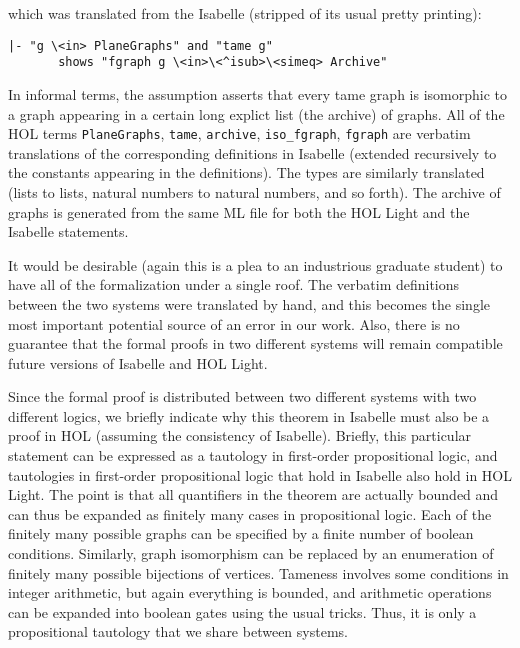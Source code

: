 which was translated from the Isabelle (stripped of its usual pretty printing):

\begin{obeylines}

\begin{verbatim}
|- "g \<in> PlaneGraphs" and "tame g" 
       shows "fgraph g \<in>\<^isub>\<simeq> Archive"
\end{verbatim}

\end{obeylines}


In informal terms, the assumption asserts that every tame graph is isomorphic to a graph appearing in a certain
long explict list (the archive) of graphs.  All of the HOL terms \verb!PlaneGraphs!, \verb!tame!, \verb!archive!,
\verb!iso_fgraph!, \verb!fgraph! are verbatim translations of the corresponding definitions in Isabelle (extended
recursively to the constants appearing in the definitions).  The types are similarly translated (lists to lists, natural numbers
to natural numbers, and so forth).  The archive of graphs is generated from the same ML file for
both the HOL Light and the Isabelle statements.  

It would be desirable (again this is a plea to an industrious graduate student) to have all of the formalization under a single roof.
The verbatim definitions between the two systems were translated by hand, and this becomes the single most important potential
source of an error in our work.  Also,  there is no guarantee that
the formal proofs in two different systems will remain compatible future versions of Isabelle and HOL Light.

Since the formal proof is distributed between two different systems with two different logics, we briefly indicate why
this theorem in Isabelle must also be a proof in HOL (assuming the consistency of Isabelle).  Briefly, this particular statement
can be expressed as a tautology in first-order propositional logic, and tautologies in first-order propositional logic that hold
in Isabelle also hold in HOL Light.  The point is that all quantifiers in the theorem are actually bounded and can thus be
expanded as finitely many cases in propositional logic.   Each of the finitely many possible graphs can be specified by a finite number of
boolean conditions.  Similarly, graph isomorphism can be replaced by an enumeration of finitely
many possible bijections of vertices.  
Tameness involves some conditions in integer arithmetic, but again everything is bounded, 
and arithmetic operations can be expanded into boolean gates using the usual tricks.    Thus, it is only a propositional tautology
that we share between systems.



